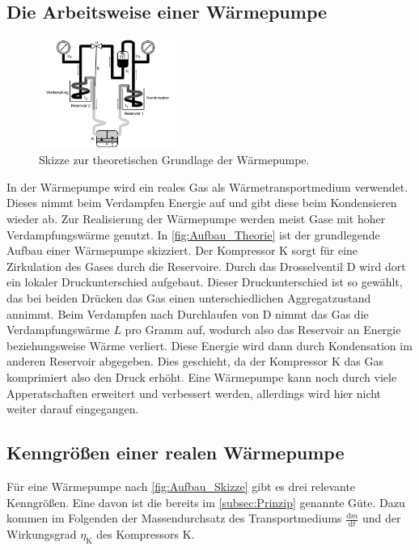 \subsection{Die Arbeitsweise einer Wärmepumpe}
\label{Arbeitsweise}
\begin{figure}
    \centering
    \includegraphics[width=0.4\textwidth]{content/Ausfbau_Skizze_Theorie.png}
	\caption{Skizze zur theoretischen Grundlage der Wärmepumpe.}
	\label{fig:Aufbau_Theorie}
\end{figure}


In der Wärmepumpe wird ein reales Gas als Wärmetransportmedium verwendet. Dieses nimmt beim Verdampfen Energie auf und gibt diese beim Kondensieren wieder ab. Zur Realisierung der 
Wärmepumpe werden meist Gase mit hoher Verdampfungswärme genutzt. In \autoref{fig:Aufbau_Theorie} ist der grundlegende Aufbau einer Wärmepumpe skizziert. Der Kompressor K sorgt für eine Zirkulation 
des Gases durch die Reservoire. Durch das Drosselventil D wird dort ein lokaler Druckunterschied aufgebaut. Dieser Druckunterschied ist so gewählt, das bei beiden Drücken das Gas
einen unterschiedlichen Aggregatzustand annimmt. Beim Verdampfen nach Durchlaufen von D nimmt das Gas die Verdampfungswärme $L$ pro Gramm auf, wodurch also das Reservoir an Energie 
beziehungsweise Wärme verliert. Diese Energie wird dann durch Kondensation im anderen Reservoir abgegeben. Dies geschieht, da der Kompressor K das Gas komprimiert also den Druck erhöht.
Eine Wärmepumpe kann noch durch viele Apperatschaften erweitert und verbessert werden, allerdings wird hier nicht weiter darauf eingegangen. 

\subsection{Kenngrößen einer realen Wärmepumpe}
\label{subsec:Kenngrößen}

Für eine Wärmepumpe nach \autoref{fig:Aufbau_Skizze} gibt es drei relevante Kenngrößen. Eine davon ist die bereits im \autoref{subsec:Prinzip} genannte Güte. Dazu kommen im
Folgenden der Massendurchsatz des Transportmediums $\frac{\text{d}m}{\text{d}t}$ und der Wirkungsgrad $\eta_{\text{K}}$ des Kompressors K. 


